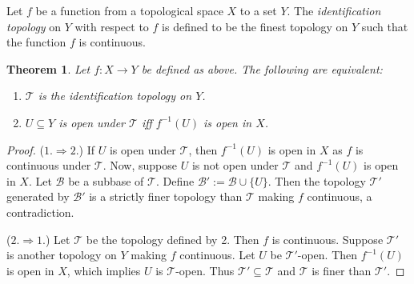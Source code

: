 \documentclass[12pt]{article}
\newtheorem{thm}{Theorem}
\begin{document}
Let $f$ be a function from a topological space $X$ to a set $Y$.  The \emph{identification topology} on $Y$ with respect to $f$ is defined to be the finest topology on $Y$ such that the function $f$ is continuous.

\begin{thm} Let $f:X\to Y$ be defined as above.  The following are equivalent:
\begin{enumerate}
\item $\mathcal{T}$ is the identification topology on $Y$.
\item $U\subseteq Y$ is open under $\mathcal{T}$ iff $f^{-1}(U)$ is open in $X$.
\end{enumerate}
\end{thm}
\begin{proof}
($1.\Rightarrow 2.$)  If $U$ is open under $\mathcal{T}$, then $f^{-1}(U)$ is open in $X$ as $f$ is continuous under $\mathcal{T}$.  Now, suppose $U$ is not open under $\mathcal{T}$ and $f^{-1}(U)$ is open in $X$.  Let $\mathcal{B}$ be a subbase of $\mathcal{T}$.  Define $\mathcal{B}':=\mathcal{B}\cup \lbrace U\rbrace$.  Then the topology $\mathcal{T}'$ generated by $\mathcal{B}'$ is a strictly finer topology than $\mathcal{T}$ making $f$ continuous, a contradiction.

($2.\Rightarrow 1.$)  Let $\mathcal{T}$ be the topology defined by 2.  Then $f$ is continuous.  Suppose $\mathcal{T}'$ is another topology on $Y$ making $f$ continuous.  Let $U$ be $\mathcal{T}'$-open.  Then $f^{-1}(U)$ is open in $X$, which implies $U$ is $\mathcal{T}$-open.  Thus $\mathcal{T}'\subseteq \mathcal{T}$ and $\mathcal{T}$ is finer than $\mathcal{T}'$.
\end{proof}
\end{document}
